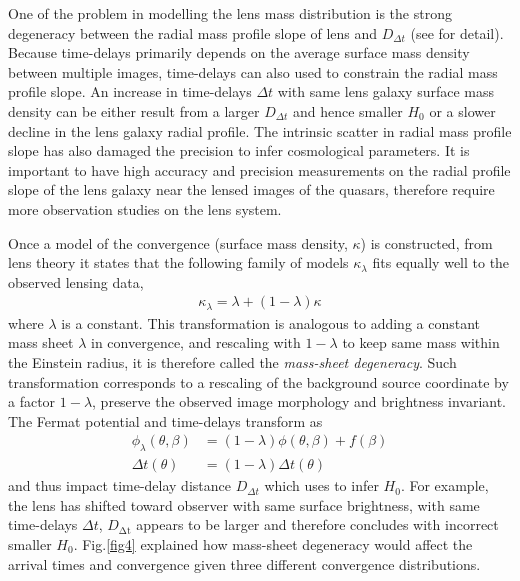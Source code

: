 \documentclass{cosmo}
\begin{document}
    One of the problem in modelling the lens mass distribution is the strong degeneracy between the radial mass profile slope of lens and $D_{\Delta t}$ (see \citealt{Suyu2012} for detail). Because time-delays primarily depends on the average surface mass density between multiple images, time-delays can also used to constrain the radial mass profile slope. An increase in time-delays $\Delta t$ with same lens galaxy surface mass density can be either result from a larger $D_{\Delta t}$ and hence smaller $H_\mathrm{0}$ or a slower decline in the lens galaxy radial profile. The intrinsic scatter in radial mass profile slope has also damaged the precision to infer cosmological parameters. It is important to have high accuracy and precision measurements on the radial profile slope of the lens galaxy near the lensed images of the quasars, therefore require more observation studies on the lens system.
    
    Once a model of the convergence (surface mass density, $\kappa$) is constructed, from lens theory it states that the following family of models $\kappa_{\lambda}$ fits equally well to the observed lensing data,
    \begin{align*}
        \kappa_{\lambda} = \lambda + (1-\lambda)\kappa
    \end{align*}
    where $\lambda$ is a constant. This transformation is analogous to adding a constant mass sheet $\lambda$ in convergence, and rescaling with $1-\lambda$ to keep same mass within the Einstein radius, it is therefore called the \emph{mass-sheet degeneracy}. Such transformation corresponds to a rescaling of the background source coordinate by a factor $1-\lambda$, preserve the observed image morphology and brightness invariant.
    The Fermat potential and time-delays transform as 
    \begin{align*}
        \phi_{\lambda} (\theta, \beta) &= (1-\lambda) \phi(\theta, \beta) + f(\beta)\\
        \Delta t (\theta) &= (1-\lambda) \Delta t (\theta) 
    \end{align*}
    and thus impact time-delay distance $D_{\Delta t}$ which uses to infer $H_\mathrm{0}$. For example, the lens has shifted toward observer with same surface brightness, with same time-delays $\Delta t$, $D_{\mathrm{\Delta t}}$ appears to be larger and therefore concludes with incorrect smaller $H_\mathrm{0}$. Fig.\ref{fig4} explained how mass-sheet degeneracy would affect the arrival times and convergence given three different convergence distributions.  
    
\end{document}
